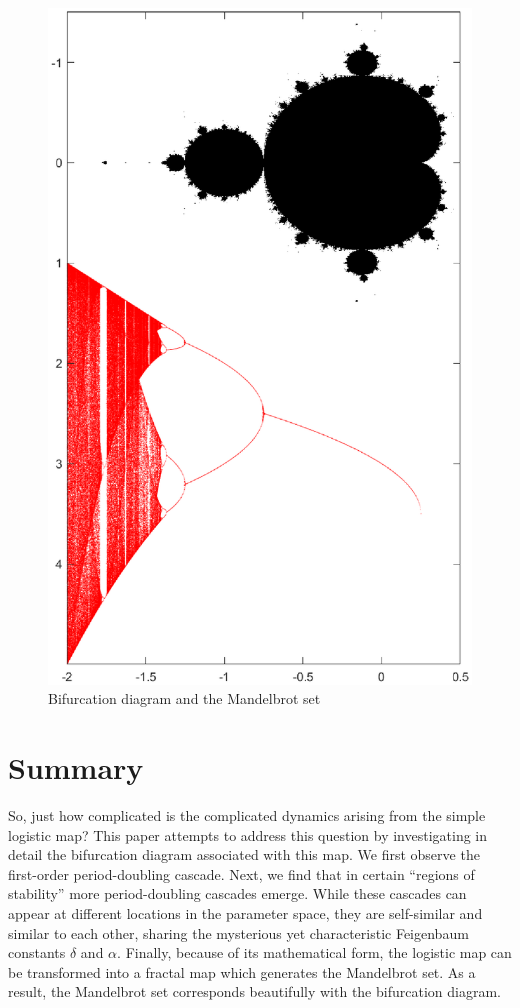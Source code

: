 \documentclass[twocolumn,amsmath,amssymb,aps]{revtex4}
\begin{document}
\begin{figure}[!htb]
	\centering
	\includegraphics[scale=0.45]{mandelbrot_1}
	\caption{Bifurcation diagram and the Mandelbrot set}
	\label{fig:mandelbrot}
\end{figure}



\section{Summary}


So, just how complicated is the complicated dynamics arising from the simple logistic map? This paper attempts to address this question by investigating in detail the bifurcation diagram associated with this map. We first observe the first-order period-doubling cascade. Next, we find that in certain ``regions of stability'' more period-doubling cascades emerge. While these cascades can appear at different locations in the parameter space, they are self-similar and similar to each other, sharing the mysterious yet characteristic Feigenbaum constants $\delta$ and $\alpha$. Finally, because of its mathematical form, the logistic map can be transformed into a fractal map which generates the Mandelbrot set. As a result, the Mandelbrot set corresponds beautifully with the bifurcation diagram. 
\end{document}
